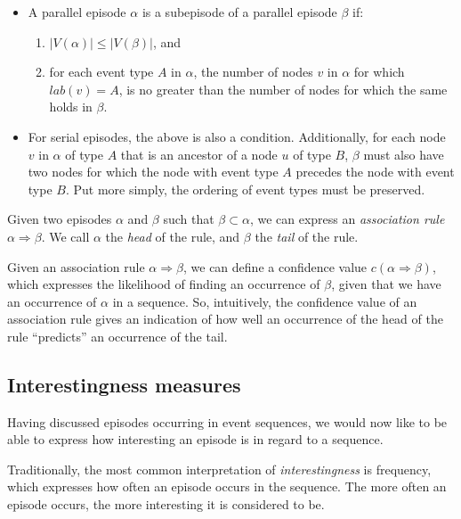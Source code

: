 \begin{itemize}
\item A parallel episode $ \alpha $ is a subepisode of a parallel episode $ \beta $ if:
\begin{enumerate}
\item $ | V(\alpha) | \leq | V(\beta) | $, and
\item for each event type $ A $ in $ \alpha $, the number of nodes $ v $ in $ \alpha $ for which $ lab(v) = A $, is no greater than the number of nodes for which the same holds in $ \beta $.
\end{enumerate}
\item For serial episodes, the above is also a condition. Additionally, for each node $ v $ in $ \alpha $ of type $ A $ that is an ancestor of a node $ u $ of type $ B $, $ \beta $ must also have two nodes for which the node with event type $ A $ precedes the node with event type $ B $. Put more simply, the ordering of event types must be preserved.
\end{itemize}

\begin{definition}
Given two episodes $ \alpha $ and $ \beta $ such that $ \beta \subset \alpha $, we can express an \emph{association rule} $ \alpha \Rightarrow \beta $. We call $ \alpha $ the \emph{head} of the rule, and $ \beta $ the \emph{tail} of the rule.
\end{definition}

Given an association rule $ \alpha \Rightarrow \beta $, we can define a confidence value $ c(\alpha \Rightarrow \beta) $, which expresses the likelihood of finding an occurrence of $ \beta $, given that we have an occurrence of $ \alpha $ in a sequence. So, intuitively, the confidence value of an association rule gives an indication of how well an occurrence of the head of the rule ``predicts'' an occurrence of the tail.

\subsection{Interestingness measures}

Having discussed episodes occurring in event sequences, we would now like to be able to express how interesting an episode is in regard to a sequence.

Traditionally, the most common interpretation of \emph{interestingness} is frequency, which expresses how often an episode occurs in the sequence. The more often an episode occurs, the more interesting it is considered to be.

